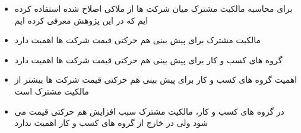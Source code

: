 \documentclass[12pt, a4paper]{article}
\begin{document}
 
 \begin{itemize}
 \item
برای محاسبه مالکیت مشترک میان شرکت ها از ملاکی اصلاح شده استفاده کرده ایم که در این پژوهش معرفی کرده ایم

 \end{itemize}


\begin{itemize}
\item
مالکیت مشترک برای پیش بینی هم حرکتی قیمت شرکت ها اهمیت دارد
\item 
گروه های کسب و کار برای پیش بینی هم حرکتی قیمت شرکت ها اهمیت دارد
\item
اهمیت گروه های کسب و کار برای پیش بینی هم حرکتی قیمت شرکت ها بیشتر از مالکیت مشترک است
\item
 در گروه های کسب و کار، مالکیت مشترک سبب افزایش هم حرکتی قیمت می شود ولی در خارج از گروه های کسب و کار اهمیت ندارد
\end{itemize}
\end{document}

